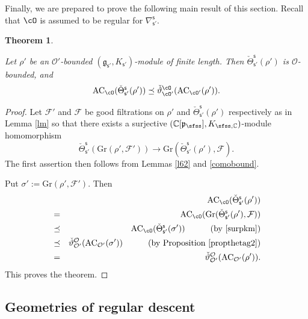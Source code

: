\documentclass[12pt,a4paper]{amsart}
\newcommand{\CF}{{\mathcal {F}}}
\newcommand{\CO}{{\mathcal {O}}}
\newcommand{\g}{\mathfrak g}
\newcommand{\p}{\mathfrak p}
\def\DD{\nabla}
\newcommand{\be}{\begin {equation}}
\newcommand{\ee}{\end {equation}}
\numberwithin{equation}{section}
\newtheorem{thm}{Theorem}[section]
\theoremstyle{remark}
\def\UU{\rU}
\def\cOp{\cO^{\prime}}
\begin{document}
Finally, we are prepared to prove the following main result of this section. Recall that  $\cO$ is assumed to be  regular  for $\DD_{\mathsf s'}^{\mathsf s}$.
\begin{thm}\label{prop:GDS.AC}
  
  Let $\rho'$ be an $\CO'$-bounded $(\g_{\mathsf s'}, K_{\mathsf s'})$-module of finite length. Then  $\check \Theta_{\mathsf s'}^{\mathsf s}(\rho')$ is $\CO$-bounded, and
    \[
    \mathrm{AC}_{\cO}(\check \Theta_{\mathsf s'}^{\mathsf s}(\rho'))\preceq \check \vartheta_{\cO'}^\cO(\mathrm{AC}_{\cO'}(\rho')).
  \]
\end{thm}
\begin{proof}
Let $\CF'$ and $\CF$ be  good filtrations  on $\rho'$ and  $\check \Theta_{\mathsf s'}^{\mathsf s}(\rho')$ respectively as in Lemma \ref{lm} so that there exists a 
 surjective $(\C[\p_{\sfss}], K_{\sfss, \C})$-module homomorphism
\be\label{surpkm}
  \check \Theta_{\mathsf s'}^{\mathsf s}(\mathrm{Gr}(\rho',\CF')) \rightarrow \mathrm{Gr}(\check \Theta_{\mathsf s'}^{\mathsf s}(\rho'),\CF).
\ee
The first assertion then follows from Lemmas \ref{l62} and \ref{comobound}. 

Put $\sigma':=\mathrm{Gr}(\rho',\CF')$. 
Then
\begin{eqnarray*}
      && \mathrm{AC}_{\cO}(\check \Theta_{\mathsf s'}^{\mathsf s}(\rho'))\\
      &=&  \mathrm{AC}_{\cO}(\mathrm{Gr}(\check \Theta_{\mathsf s'}^{\mathsf s}(\rho'),\CF))\\
             &\preceq& \mathrm{AC}_{\cO}(\check \Theta_{\mathsf s'}^{\mathsf s}(\sigma')) \quad \qquad (\textrm{by \eqref{surpkm}})\\
          &  \preceq & \check \vartheta_{\CO'}^{\CO}(\mathrm{AC}_{\CO'}(\sigma'))\quad \qquad (\textrm{by Proposition \ref{propthetag2}})\\ 
               &=&\check \vartheta_{\CO'}^{\CO}(\mathrm{AC}_{\CO'}(\rho')).
               \end{eqnarray*}
This proves the theorem. 
\end{proof}


\subsection{Geometries of regular descent}
\label{sec:GG}


\def\UU{{\bar \partial}}
\def\dbM{\breve{M}}
\def\dbMM{\breve{MM}}
\def\dbX{\breve{X}}
\def\dbfpp{\breve{\fpp}}
\def\ZdbX{\cZ_{\dbX}}
\def\aV{\acute{V}}
\def\fggs{\fgg_{\sfss}}
\def\fggsp{\fgg_{\sfss'}}
\def\fggspp{\fgg_{\sfss''}}
\def\fggspo{\fgg_{\sfss'_0}}
\def\fggspt{\fgg_{\sfss'_1}}
\def\fggspi{\fgg_{\sfss'_i}}
\def\fkks{\fkk_{\sfss}}
\def\fkksp{\fkk_{\sfss'}}
\def\fkkspo{\fkk_{\sfss'_0}}
\def\fkkspt{\fkk_{\sfss'_1}}
\def\fkkspi{\fkk_{\sfss'_i}}
\def\fpps{\fpp_{\sfss}}
\def\fppsp{\fpp_{\sfss'}}
\def\fppspo{\fpp_{\sfss'_0}}
\def\fppspt{\fpp_{\sfss'_1}}
\def\fppspi{\fpp_{\sfss'_i}}
\def\DDss{\DD_{\sfss'}^{\sfss}}
\def\DDsso{\DD_{\sfss'_0}^{\sfss}}
\def\cOpo{\cOp_{0}}
\def\Mss{M_{\sfss,\sfss'}}
\def\Ms{M_{\sfss}}
\def\Msp{M_{\sfss'}}
\end{document}
